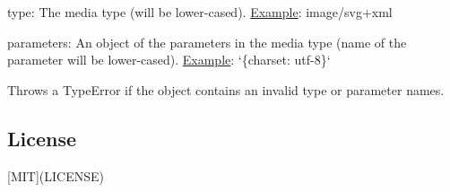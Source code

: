 \begin{DoxyItemize}
\item {\ttfamily type}\+: The media type (will be lower-\/cased). \hyperlink{struct_example}{Example}\+: {\ttfamily \textquotesingle{}image/svg+xml\textquotesingle{}}
\item {\ttfamily parameters}\+: An object of the parameters in the media type (name of the parameter will be lower-\/cased). \hyperlink{struct_example}{Example}\+: `\{charset\+: \textquotesingle{}utf-\/8\textquotesingle{}\}`
\end{DoxyItemize}

Throws a {\ttfamily Type\+Error} if the object contains an invalid type or parameter names.

\subsection*{License}

\mbox{[}M\+I\+T\mbox{]}(L\+I\+C\+E\+N\+S\+E) 